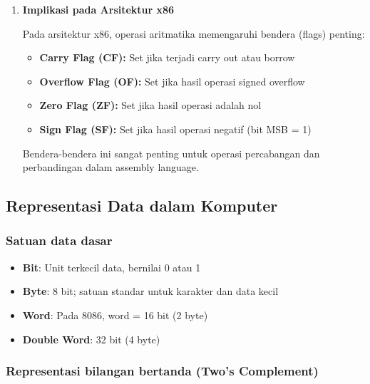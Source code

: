 \documentclass[../main.tex]{subfiles}
\begin{document}
\begin{enumerate}
                \item \textbf{Implikasi pada Arsitektur x86}

                    Pada arsitektur x86, operasi aritmatika memengaruhi bendera (flags) penting:
                    \begin{itemize}
                        \item \textbf{Carry Flag (CF):} Set jika terjadi carry out atau borrow
                        \item \textbf{Overflow Flag (OF):} Set jika hasil operasi signed overflow
                        \item \textbf{Zero Flag (ZF):} Set jika hasil operasi adalah nol
                        \item \textbf{Sign Flag (SF):} Set jika hasil operasi negatif (bit MSB = 1)
                    \end{itemize}

                    Bendera-bendera ini sangat penting untuk operasi percabangan dan perbandingan dalam assembly language.
            \end{enumerate}

    \subsection{Representasi Data dalam Komputer}\label{subsec:pengenalan-representasi-data}

        \subsubsection{Satuan data dasar}
            \begin{itemize}
                \item \textbf{Bit}: Unit terkecil data, bernilai 0 atau 1
                \item \textbf{Byte}: 8 bit; satuan standar untuk karakter dan data kecil
                \item \textbf{Word}: Pada 8086, word = 16 bit (2 byte)
                \item \textbf{Double Word}: 32 bit (4 byte)
            \end{itemize}

        \subsubsection{Representasi bilangan bertanda (Two's Complement)}
\end{document}
